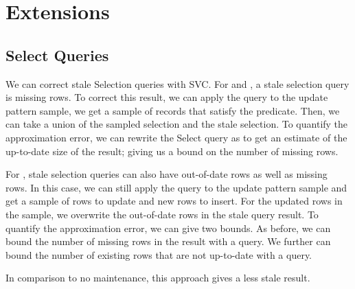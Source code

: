 \section{Extensions}
\subsection{Select Queries}\label{sec:sel}
We can correct stale Selection queries with SVC. 
For \fjview and \spview, a stale selection query is missing rows.
To correct this result, we can apply the query to the update pattern sample, we get a sample of records that satisfy the predicate.
Then, we can take a union of the sampled selection and the stale selection.
To quantify the approximation error, we can rewrite the Select query as \countfunc to get an estimate of the up-to-date size of the result; giving us a bound on the number of missing rows. 

For \aggview, stale selection queries can also have out-of-date rows as well as missing rows.
In this case, we can still apply the query to the update pattern sample and get a sample of rows to update and new rows to insert.
For the updated rows in the sample, we overwrite the out-of-date rows in the stale query result.
To quantify the approximation error, we can give two bounds.
As before, we can bound the number of missing rows in the result with a \countfunc query.
We further can bound the number of existing rows that are not up-to-date with a \countfunc query.

In comparison to no maintenance, this approach gives a less stale result. 

\iffalse
SAQP is limited in its support of Selection queries.
For example, if we had a 1\% sample, we could only get 1\% of the rows in the result.
In comparison, for a 1\% sample, we take advantage of the existing stale result allowing us to combine to old result with 1\% of the newly inserted records; thus including a much greater portion of the result rows.
\fi



